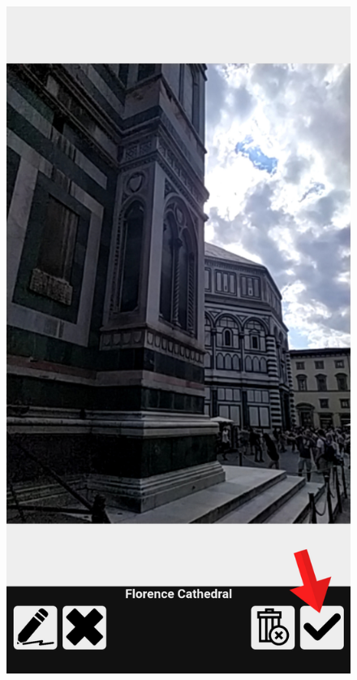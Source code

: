 \documentclass{beamer}
\begin{document}
\begin{frame}
\begin{columns}
\begin{itemize}
\begin{figure}[!h]
 			\includegraphics[scale=0.1]{"Immagini/editor5.jpg"}
 		\end{figure}
\end{itemize}
\end{columns}
\end{frame}
\end{document}
